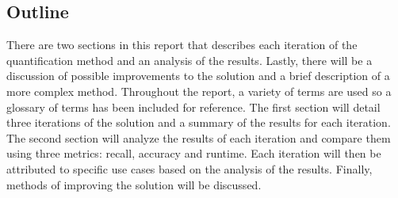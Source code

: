 	\subsection{Outline} %
	\label{sub:outline}
There are two sections in this report that describes each iteration of the quantification method and an analysis of the results. Lastly, there will be a discussion of possible improvements to the solution and a brief description of a more complex method. Throughout the report, a variety of terms are used so a glossary of terms has been included for reference.  The first section will detail three iterations of the solution and a summary of the results for each iteration. The second section will analyze the results of each iteration and compare them using three metrics: recall, accuracy and runtime.  Each iteration will then be attributed to specific use cases based on the analysis of the results. Finally, methods of improving the solution will be discussed.

